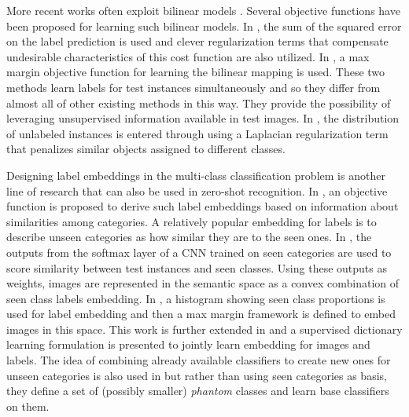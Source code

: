 \documentclass[10pt,twocolumn,letterpaper]{article}
\begin{document}
More recent works often exploit bilinear models \cite{Yu2013,devise,convex,sse,emb15,semi15}.
 Several objective functions have been proposed for learning such bilinear models.
In \cite{emb15}, the sum of the squared error on the label prediction is used and clever regularization
 terms that compensate undesirable characteristics of this cost function are also utilized.
In \cite{li15max,semi15}, a max margin objective function for learning the bilinear mapping is used.
 These two methods learn labels for test instances simultaneously and so they differ from almost all of other existing methods in this way.
 They provide the possibility of
leveraging unsupervised information available in test images. In \cite{semi15},
the distribution of unlabeled instances is entered through using a Laplacian regularization term that penalizes similar objects assigned to different classes.

Designing label embeddings in the multi-class classification problem
is another line of research that can also be used in zero-shot recognition.
 In \cite{Yu2013}, an objective function is proposed to derive such label embeddings based on information about similarities among categories.
A relatively popular embedding for labels is to describe unseen categories as how similar they are to the seen ones.
In \cite{convex}, the outputs from the softmax layer of a CNN trained on seen categories are used to score similarity between test instances and seen classes.
Using these outputs as weights, images are represented in the semantic space as a convex combination of seen class labels embedding.
In \cite{sse}, a histogram showing seen class proportions is used for label embedding and then a max margin framework is defined to embed images in this space.
This work is further extended in \cite{agnostic} and a supervised dictionary learning formulation is presented to jointly learn embedding for images and labels.
%
 The idea of combining already available classifiers to create new ones for unseen categories is also used in \cite{Synthesized}
 but rather than using seen categories as basis, they define a set of (possibly smaller) \textit{phantom} classes and learn base classifiers on them.
\end{document}
